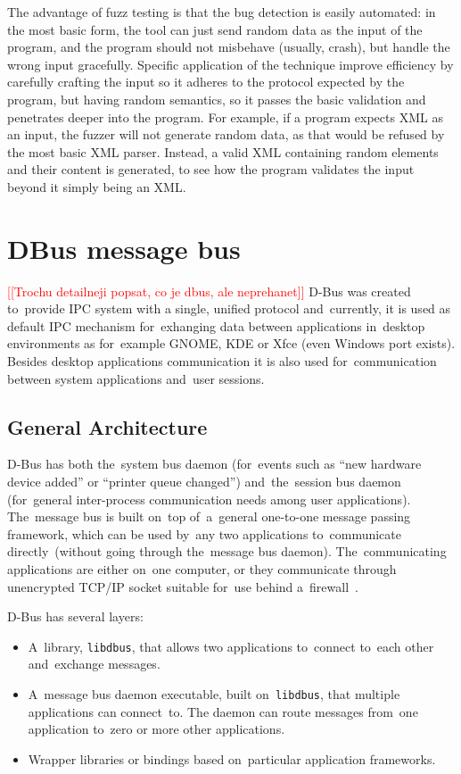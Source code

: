 \documentclass[conference]{IEEEtran}
\newcommand{\addtodo}[1]{\textcolor{red}{[[#1]]}}
\begin{document}
The advantage of fuzz testing is that the bug detection is easily automated: in
the most basic form, the tool can just send random data as the input of the
program, and the program should not misbehave (usually, crash), but handle the
wrong input gracefully. Specific application of the technique improve efficiency by
carefully crafting the input so it adheres to the protocol expected by the
program, but having random semantics, so it passes the basic validation and
penetrates deeper into the program. For example, if a program expects XML as an
input, the fuzzer will not generate random data, as that would be refused by
the most basic XML parser. Instead, a valid XML containing random elements and
their content is generated, to see how the program validates the input beyond
it simply being an XML.

\section{DBus message bus}
\addtodo{Trochu detailneji popsat, co je dbus, ale neprehanet}
D-Bus was created to~provide IPC system with a single, unified protocol
and~currently, it is used as default IPC mechanism for~exhanging data between
applications in~desktop environments as for~example GNOME, KDE or Xfce (even
Windows port exists). Besides desktop applications communication it is also used
for~communication between system applications and~user sessions.

\subsection{General Architecture}

D-Bus has both the~system bus daemon (for~events such as ``new hardware device
added'' or ``printer queue changed'') and~the~session bus daemon (for~general
inter-process communication needs among user \mbox{applications}). The~message bus
is built on~top of~a~general one-to-one message passing framework, which can be
used by~any two applications to~communicate directly~(without going through
the~message bus daemon). The~communicating applications are either on~one computer,
or they communicate through unencrypted TCP/IP socket suitable for~use behind
a~firewall~\cite{DBUS}.

D-Bus has several layers:
\begin{itemize}
	\item A~library, \texttt{libdbus}, that allows two applications to~connect
		to~each other and~exchange messages.
	\item A~message bus daemon executable, built on~\texttt{libdbus},
		that multiple applications can connect~to. The daemon can route messages
		from~one application to~zero or more other applications.
	\item Wrapper libraries or bindings based on~particular application frameworks.
\end{itemize}
\end{document}
